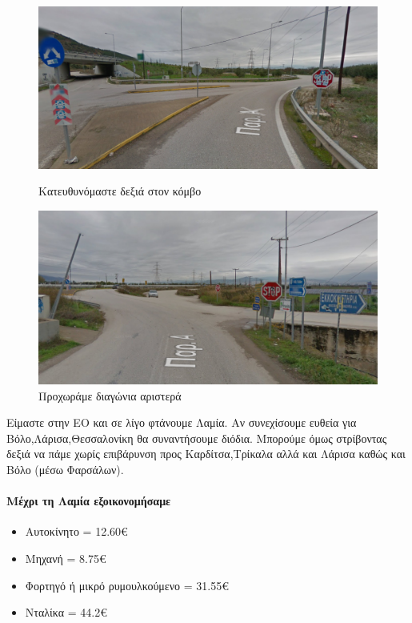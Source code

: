 \begin{figure}[H]
	\centering
		\includegraphics[width=\textwidth]{images/athina-lamia/lamia/lamia5.PNG}
			\caption{Κατευθυνόμαστε δεξιά στον κόμβο}
	
	\centering
		\includegraphics[width=\textwidth]{images/athina-lamia/lamia/lamia6.PNG}
			\caption{Προχωράμε διαγώνια αριστερά}
\end{figure}

Είμαστε στην ΕΟ και σε λίγο φτάνουμε Λαμία. Αν συνεχίσουμε ευθεία για Βόλο,Λάρισα,Θεσσαλονίκη θα συναντήσουμε διόδια. Μπορούμε όμως στρίβοντας δεξιά να πάμε χωρίς επιβάρυνση προς Καρδίτσα,Τρίκαλα αλλά και Λάρισα καθώς και Βόλο (μέσω Φαρσάλων).
\vspace{12pt}
\paragraph{Μέχρι τη Λαμία εξοικονομήσαμε}
\begin{itemize}
\item Αυτοκίνητο = 12.60€
\item Μηχανή = 8.75€
\item Φορτηγό ή μικρό ρυμουλκούμενο = 31.55€
\item Νταλίκα = 44.2€
\end{itemize}
\newpage
